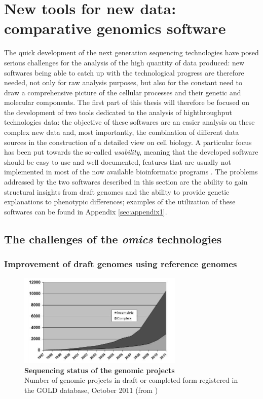 \logvartrue
\chapter{New tools for new data: comparative genomics software}

The quick development of the next generation sequencing technologies have posed serious challenges for the analysis of the high quantity of data produced: new softwares being able to catch up with the technological progress are therefore needed, not only for raw analysis purposes, but also for the constant need to draw a comprehensive picture of the cellular processes and their genetic and molecular components. The first part of this thesis will therefore be focused on the development of two tools dedicated to the analysis of highthroughput technologies data: the objective of these softwares are an easier analysis on these complex new data and, most importantly, the combination of different data sources in the construction of a detailed view on cell biology. A particular focus has been put towards the so-called \textit{usability}, meaning that the developed software should be easy to use and well documented, features that are usually not implemented in most of the now available bioinformatic programs \cite{corpas2012not}. The problems addressed by the two softwares described in this section are the ability to gain structural insights from draft genomes and the ability to provide genetic explanations to phenotypic differences; examples of the utilization of these softwares can be found in Appendix \ref{sec:appendix1}.

\section{The challenges of the \textit{omics} technologies}
\subsection{Improvement of draft genomes using reference genomes}
\begin{figure}[!tb]
	\center
    \includegraphics[width=0.7\textwidth]{figures/2/thesis_20}
	\caption{\label{fig:golddraft}\textbf{Sequencing status of the genomic projects}\\
			Number of genomic projects in draft or completed form registered in the GOLD database, October 2011 (from \cite{gold})}
\end{figure}

